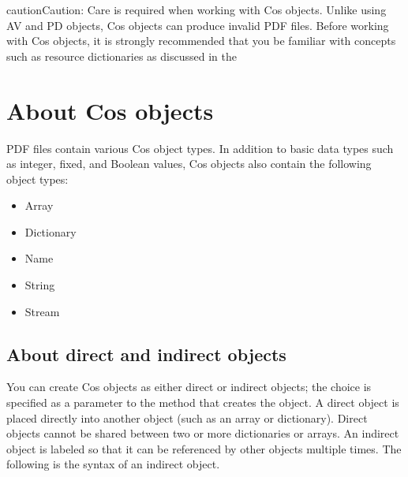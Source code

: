 \documentclass[letterpaper,12pt,english,openany,oneside]{sphinxmanual}
\begin{document}
\begin{sphinxadmonition}{caution}{Caution:}
Care is required when working with Cos objects. Unlike using AV and PD objects, Cos objects can produce invalid PDF files. Before working with Cos objects, it is strongly recommended that you be familiar with concepts such as resource dictionaries as discussed in the 
\end{sphinxadmonition}


\section{About Cos objects}
\label{\detokenize{Plugins_Cos:about-cos-objects}}
PDF files contain various Cos object types. In addition to basic data types such as integer, fixed, and Boolean values, Cos objects also contain the following object types:
\begin{itemize}
\item {} 
Array

\item {} 
Dictionary

\item {} 
Name

\item {} 
String

\item {} 
Stream

\end{itemize}


\subsection{About direct and indirect objects}
\label{\detokenize{Plugins_Cos:about-direct-and-indirect-objects}}
You can create Cos objects as either direct or indirect objects; the choice is specified as a parameter to the method that creates the object. A direct object is placed directly into another object (such as an array or dictionary). Direct objects cannot be shared between two or more dictionaries or arrays. An indirect object is labeled so that it can be referenced by other objects multiple times. The following is the syntax of an indirect object.

\begin{sphinxVerbatim}[commandchars=\\\{\}]
    
     
\end{sphinxVerbatim}
\end{document}
